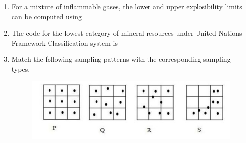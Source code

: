 \documentclass[journal,12pt,onecolumn]{IEEEtran}
\theoremstyle{remark}
\begin{document}
\begin{enumerate}
\begin{enumerate}
\end{enumerate}

\item For a mixture of inflammable gases, the lower and upper explosibility limits can be computed using

\hfill{}

\begin{enumerate}
\end{enumerate}

\item The code for the lowest category of mineral resources under United Nations Framework Classification  system is

\hfill{}

\begin{enumerate}
\end{enumerate}

\item Match the following sampling patterns with the corresponding sampling types.

\begin{figure}[H]
\centering
\caption*{}
\label{fig:q14}
\includegraphics[width=0.5\columnwidth]{figs/2020mn14.jpeg}


\end{figure}
\end{enumerate}
\end{document}
